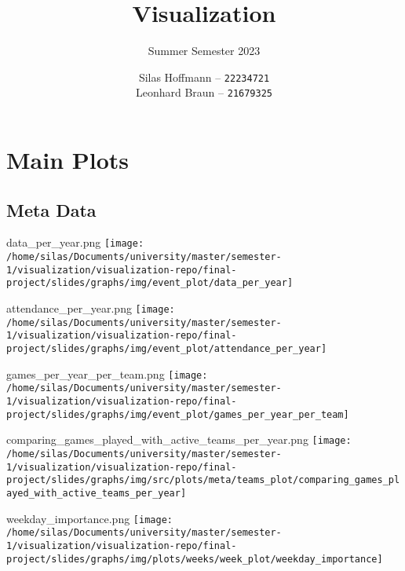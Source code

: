 \documentclass[pdf]{beamer}
\title{Visualization}
\subtitle{Summer Semester 2023}
\author{
    Silas Hoffmann --
    \texttt{22234721} \\
    Leonhard Braun --
    \texttt{21679325} \\
}
\institute{Georg-August-Universität Göttingen}
\begin{document}
\maketitle

\section{Main Plots}
\subsection{Meta Data}
\begin{frame}{data\_per\_year.png}
	\centering
	\texttt{[image: /home/silas/Documents/university/master/semester-1/visualization/visualization-repo/final-project/slides/graphs/img/event\_plot/data\_per\_year]}
\end{frame}
\begin{frame}{attendance\_per\_year.png}
	\centering
	\texttt{[image: /home/silas/Documents/university/master/semester-1/visualization/visualization-repo/final-project/slides/graphs/img/event\_plot/attendance\_per\_year]}
\end{frame}
\begin{frame}{games\_per\_year\_per\_team.png}
	\centering
	\texttt{[image: /home/silas/Documents/university/master/semester-1/visualization/visualization-repo/final-project/slides/graphs/img/event\_plot/games\_per\_year\_per\_team]}
\end{frame}
\begin{frame}{comparing\_games\_played\_with\_active\_teams\_per\_year.png}
	\centering
	\texttt{[image: /home/silas/Documents/university/master/semester-1/visualization/visualization-repo/final-project/slides/graphs/img/src/plots/meta/teams\_plot/comparing\_games\_played\_with\_active\_teams\_per\_year]}
\end{frame}
\begin{frame}{weekday\_importance.png}
	\centering
	\texttt{[image: /home/silas/Documents/university/master/semester-1/visualization/visualization-repo/final-project/slides/graphs/img/plots/weeks/week\_plot/weekday\_importance]}
\end{frame}
\end{document}
